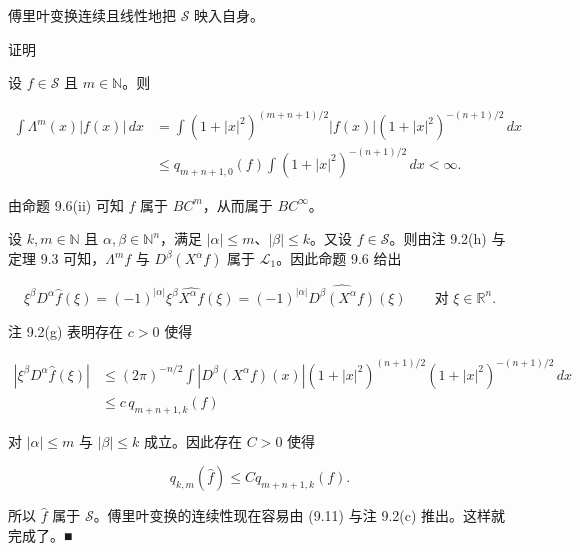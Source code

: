 \begin{proposition}

傅里叶变换连续且线性地把 $ \mathcal{S} $ 映入自身。

证明

\begin{subitems}
\item

设 $ f \in \mathcal{S} $ 且 $ m \in \mathbb{N} $。则

\begin{equation*}
\begin{aligned}
\int\Lambda^m(x)|f(x)|\,dx &= \int(1+|x|^2)^{(m+n+1)/2}|f(x)|(1+|x|^2)^{-(n+1)/2}\,dx \\ &\le q_{m+n+1,0}(f)\int(1+|x|^2)^{-(n+1)/2}\,dx < \infty .
\end{aligned}
\end{equation*}

由命题 9.6(ii) 可知 $ \widehat{f} $ 属于 $ BC^m $，从而属于 $ BC^\infty $。

\item

设 $ k,m \in \mathbb{N} $ 且 $ \alpha,\beta \in \mathbb{N}^n $，满足 $ |\alpha| \le m $、$ |\beta| \le k $。又设 $ f \in \mathcal{S} $。则由注 9.2(h) 与定理 9.3 可知，$ \Lambda^m f $ 与 $ D^\beta(X^\alpha f) $ 属于 $ \mathcal{L}_1 $。因此命题 9.6 给出

\begin{equation}
\xi^\beta D^\alpha\widehat{f}(\xi) = (-1)^{|\alpha|}\xi^\beta\widehat{X^\alpha f}(\xi) = (-1)^{|\alpha|}\widehat{D^\beta(X^\alpha f)}(\xi) \qquad \text{对 } \xi \in \mathbb{R}^n .\tag{9.10}
\end{equation}

注 9.2(g) 表明存在 $ c > 0 $ 使得

\begin{equation*}
\begin{aligned}
|\xi^\beta D^\alpha\widehat{f}(\xi)| &\le (2\pi)^{-n/2}\int|D^\beta(X^\alpha f)(x)|(1+|x|^2)^{(n+1)/2}(1+|x|^2)^{-(n+1)/2}\,dx \\ &\le c\, q_{m+n+1,k}(f)
\end{aligned}
\end{equation*}

对 $ |\alpha| \le m $ 与 $ |\beta| \le k $ 成立。因此存在 $ C > 0 $ 使得

\begin{equation}
q_{k,m}(\widehat{f}) \le Cq_{m+n+1,k}(f) .\tag{9.11}
\end{equation}

所以 $ \widehat{f} $ 属于 $ \mathcal{S} $。傅里叶变换的连续性现在容易由 (9.11) 与注 9.2(c) 推出。这样就完成了。\nobreak\hspace{0.35em}■

\end{subitems}

\end{proposition}

